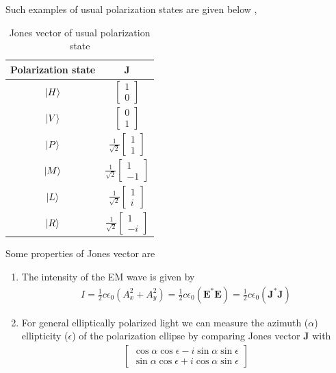 \documentclass[11pt,a4paper]{article}
\numberwithin{equation}{section}
\begin{document}
Such examples of usual polarization states are given below \cite{jones},
\begin{table}[H]
	\centering
	\begin{tabular}{ c c } 
		\hline
		\hline
		Polarization state & $\boldsymbol{J}$\\
		\hline
		$\ket{H}$ & $\begin{bmatrix}1\\0\end{bmatrix}$ \\ \hline
		$\ket{V}$ & $\begin{bmatrix}0\\1\end{bmatrix}$ \\ \hline
		$\ket{P}$ & $\frac{1}{\sqrt{2}}\begin{bmatrix}1\\1\end{bmatrix}$ \\ \hline
		$\ket{M}$ & $\frac{1}{\sqrt{2}}\begin{bmatrix}1\\-1\end{bmatrix}$ \\ \hline
		$\ket{L}$ & $\frac{1}{\sqrt{2}}\begin{bmatrix}1\\i\end{bmatrix}$ \\ \hline
		$\ket{R}$ & $\frac{1}{\sqrt{2}}\begin{bmatrix}1\\-i\end{bmatrix}$ \\ 
		\hline
		\hline
	\end{tabular}
	\caption{Jones vector of usual polarization state}
	\label{table:1}
\end{table}

Some properties of Jones vector are
\begin{enumerate}
	\item The intensity of the EM wave is given by 
	\begin{align}
		I= \frac{1}{2}c\epsilon_0(A_x^2+A_y^2) = \frac{1}{2}c\epsilon_0 (\boldsymbol{E}^\ast \boldsymbol{E})= \frac{1}{2}c\epsilon_0 (\boldsymbol{J}^\ast \boldsymbol{J})
	\end{align}
	\item For general elliptically polarized light we can measure the azimuth ($\alpha$) ellipticity ($\epsilon$) of the polarization ellipse by comparing Jones vector $\boldsymbol{J}$ with \cite{WO}
	\begin{align*}
		\begin{bmatrix}
			\cos\alpha\cos\epsilon- i \sin\alpha\sin\epsilon \\
			\sin\alpha\cos\epsilon+ i \cos\alpha\sin\epsilon
		\end{bmatrix}
	\end{align*}
\end{enumerate}
\end{document}
